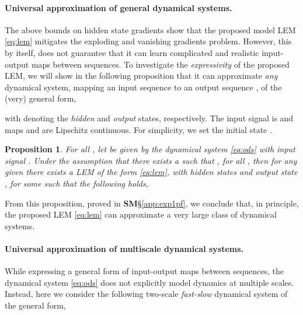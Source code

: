 \documentclass{article} \usepackage{iclr2022_conference,times}
\newtheorem{proposition}[theorem]{Proposition}
\begin{document}
\paragraph{Universal approximation of general dynamical systems.} 
The above bounds on hidden state gradients show that the proposed model LEM \eqref{eq:lem} mitigates the exploding and vanishing gradients problem. However, this by itself, does not guarantee that it can learn complicated and realistic input-output maps between sequences. To investigate the \emph{expressivity} of the proposed LEM, we will show in the following proposition that it can approximate \emph{any} dynamical system, mapping an input sequence  to an output sequence , of the (very) general form,

 with  denoting the \emph{hidden} and \emph{output} states, respectively. The input signal is  and maps  and  are Lipschitz continuous. For simplicity, we set the initial state .
 \begin{proposition}
\label{prop:exp1}
For all , let  be given by the dynamical system \eqref{eq:ods} with input signal . Under the assumption that there exists a  such that , for all , then for any given  there exists a LEM of the form \eqref{eq:lem}, with hidden states  and output state , for some  such that 
the following holds,

\end{proposition}
From this proposition, proved in {\bf SM}\S\ref{app:exp1pf}, we conclude that, in principle, the proposed LEM \eqref{eq:lem} can approximate a very large class of dynamical systems. 

\paragraph{Universal approximation of multiscale dynamical systems.} 
While expressing a general form of input-output maps between sequences, the dynamical system \eqref{eq:ods} does not explicitly model dynamics at multiple scales. Instead, here we consider the following two-scale \emph{fast-slow} dynamical system of the general form, 
\end{document}
